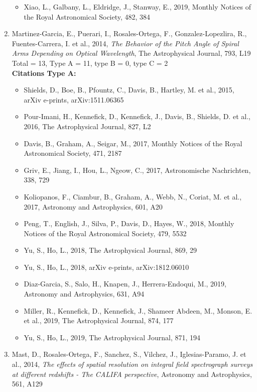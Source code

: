 \documentclass{letter}
\begin{document}
\begin{enumerate}
\begin{itemize}
\item Xiao, L., Galbany, L., Eldridge, J., Stanway, E., 2019, Monthly Notices of the Royal Astronomical Society, 482, 384
\end{itemize}
\item Martinez-Garcia, E., Puerari, I., Rosales-Ortega, F., Gonzalez-Lopezlira, R., Fuentes-Carrera, I. et al., 2014, {\it The Behavior of the Pitch Angle of Spiral Arms Depending on Optical Wavelength}, The Astrophysical Journal, 793, L19 \\ 
Total = 13, Type A = 11, type B = 0, type C = 2 \\ 
{\bf Citations Type A:}
\begin{itemize}
\item Shields, D., Boe, B., Pfountz, C., Davis, B., Hartley, M. et al., 2015, arXiv e-prints, arXiv:1511.06365
\item Pour-Imani, H., Kennefick, D., Kennefick, J., Davis, B., Shields, D. et al., 2016, The Astrophysical Journal, 827, L2
\item Davis, B., Graham, A., Seigar, M., 2017, Monthly Notices of the Royal Astronomical Society, 471, 2187
\item Griv, E., Jiang, I., Hou, L., Ngeow, C., 2017, Astronomische Nachrichten, 338, 729
\item Koliopanos, F., Ciambur, B., Graham, A., Webb, N., Coriat, M. et al., 2017, Astronomy and Astrophysics, 601, A20
\item Peng, T., English, J., Silva, P., Davis, D., Hayes, W., 2018, Monthly Notices of the Royal Astronomical Society, 479, 5532
\item Yu, S., Ho, L., 2018, The Astrophysical Journal, 869, 29
\item Yu, S., Ho, L., 2018, arXiv e-prints, arXiv:1812.06010
\item Diaz-Garcia, S., Salo, H., Knapen, J., Herrera-Endoqui, M., 2019, Astronomy and Astrophysics, 631, A94
\item Miller, R., Kennefick, D., Kennefick, J., Shameer Abdeen, M., Monson, E. et al., 2019, The Astrophysical Journal, 874, 177
\item Yu, S., Ho, L., 2019, The Astrophysical Journal, 871, 194
\end{itemize}
\item Mast, D., Rosales-Ortega, F., Sanchez, S., Vilchez, J., Iglesias-Paramo, J. et al., 2014, {\it The effects of spatial resolution on integral field spectrograph surveys at different redshifts - The CALIFA perspective}, Astronomy and Astrophysics, 561, A129 \\ 

\end{enumerate}
\end{document}
